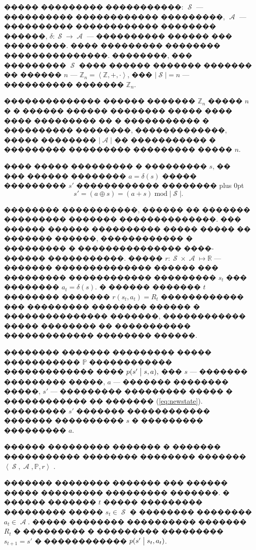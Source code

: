 \documentclass[11pt]{ubs}
\DeclareMathOperator{\state}{\mathcal{S}}
\DeclareMathOperator{\action}{\mathcal{A}}
\begin{document}
����� ��������� �����������: $ \state$ --- ���������� ������������ ���������, $ \action$ --- ���������� ������������ �������� ������, $\delta \colon \state\to \action$ --- ���������� ������ ��� ���������. ���� ��������� �������� ���������������. ��������, ��� ��������� $ \state$ ���� ������ ������� ������� �� ������ $n$ --- $\mathbb{Z}_n = \left\langle \mathbb{Z}, +, \cdot\right\rangle$, ��� $| \state| = n$ --- ���������� ������� $\mathbb{Z}_n$.


�������������� ������ ������� $\mathbb{Z}_n$ ����� $n$ � � ������ ������ �������� ����� ���� ���� ��������� �� � ����������� � ���������� ��������, �������������, ����� �������� $\left|\action\right|$ �� ����������� � ��������� ��������� ��������� ����� $n$.

���� ����� ��������� � ��������� $s$, �� ��� ������ �������� $a = \delta(s)$ ����� ��������� $s'$ ������������ ��������
{
\abovedisplayskip=0pt plus 0pt
\begin{equation}
  s'=(a\oplus s) = (a+s)\;\mathrm{mod}\;{\left\lvert\state \right\rvert}.
  \label{eq:newstate}
\end{equation}}




�������� �����������, ������ �� ������� ��������� ������� ��������������.
��� ������ ������ ���������� ����� �����  �� ������� ������, ������������ � ��������� � ��������������� ����-������ �����������.
�����  $r:  \state \times \action \mapsto \mathbb{R}$ --- ������� �������������� ������ ��� ��������� ������������ ��������� $s_t$ ��� �������� $a_t=\delta(s)$. 
� ������ ������� $t$ �������� ������� $r(s_t, a_t)=R_t$  ������������ ��� ��������� �������� ������ � ��������������� �������, ������������ ����� �������� �� ����������� ������������� �������� ������.

�������� ������� ��������� ����� ����������� $\mathbb{P}$ ������������ ������������� ����  $p(s' \bigm| s,a), $ ��� $s$ --- ������� ��������� �����, $a$ --- ������� �������� �����,  $s'$ --- ��������� ��������� ����� � ������������ �� ������� (\ref{eq:newstate}). 
��������� $s'$ ������� ������������ ������� ���������� $s$ � ��������� ��������� $a.$

������ ��������� ������� � ������� ����������� �������� �������� ������� $\left\langle  \state, \action, \mathbb{P}, r \right\rangle$ \cite{GASNIKOV}.

������� �������� ������� ��� ������ ����� ��������� ��������� �������. � ������ ������� $t$ ����� ��������� ��������� �����  $s_t\in\state$ � �������� �������� $a_t \in\action$. ����� �������� ���������� ������� $R_t$ � ��������� � ��������� ���������
$s_{t+1}=s'$ � ������������ $p(s' \bigm| s_t, a_t)$.
\end{document}
